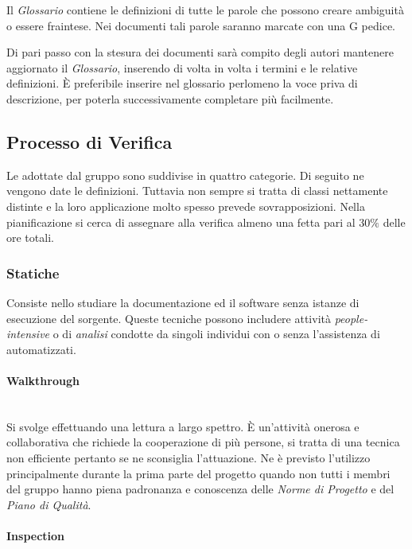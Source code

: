 Il \textit{Glossario} contiene le definizioni di tutte le parole che possono creare ambiguità o essere fraintese. Nei documenti tali parole saranno marcate con una G pedice.

Di pari passo con la stesura dei documenti sarà compito degli autori mantenere aggiornato il \textit{Glossario}, inserendo di volta in volta i termini e le relative definizioni. È preferibile inserire nel glossario perlomeno la voce priva di descrizione, per poterla successivamente completare più facilmente.


\subsection{Processo di Verifica}
	Le  adottate dal gruppo sono suddivise in quattro categorie. Di seguito ne vengono date le definizioni. Tuttavia non sempre si tratta di classi nettamente distinte e la loro applicazione molto spesso prevede sovrapposizioni.
	Nella pianificazione si cerca di assegnare alla verifica almeno una fetta pari al 30$\%$ delle ore totali.
	
		\subsubsection{Statiche}

		Consiste nello studiare la documentazione ed il software senza istanze di esecuzione del sorgente. Queste tecniche possono includere attività \emph{people-intensive} o di \emph{analisi} condotte da singoli individui con o senza l'assistenza di  automatizzati.

			\paragraph{Walkthrough} \mbox{} \\
			
			Si svolge effettuando una lettura a largo spettro. È un'attività onerosa e collaborativa che richiede la cooperazione di più persone, si tratta di una tecnica non efficiente pertanto se ne sconsiglia l'attuazione. Ne è previsto l'utilizzo principalmente durante la prima parte del progetto quando non tutti i membri del gruppo hanno piena padronanza e conoscenza delle \emph{Norme di Progetto} e del \emph{Piano di Qualità}.

			\paragraph{Inspection} \mbox{} \\
			\label{anomaliefrequenti}

